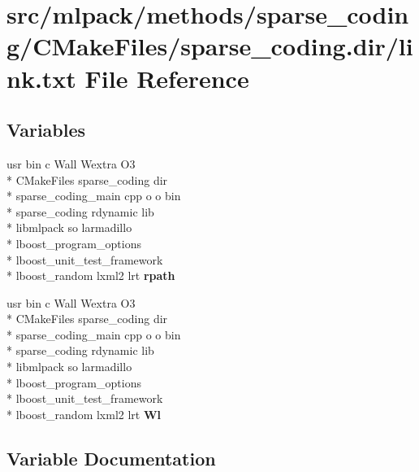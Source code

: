 \section{src/mlpack/methods/sparse\-\_\-coding/\-C\-Make\-Files/sparse\-\_\-coding.dir/link.txt File Reference}
\label{methods_2sparse__coding_2CMakeFiles_2sparse__coding_8dir_2link_8txt}
\subsection*{Variables}
\begin{DoxyCompactItemize}
\item 
usr bin c Wall Wextra O3 \\*
C\-Make\-Files sparse\-\_\-coding dir \\*
sparse\-\_\-coding\-\_\-main cpp o o bin \\*
sparse\-\_\-coding rdynamic lib \\*
libmlpack so larmadillo \\*
lboost\-\_\-program\-\_\-options \\*
lboost\-\_\-unit\-\_\-test\-\_\-framework \\*
lboost\-\_\-random lxml2 lrt {\bf rpath}
\item 
usr bin c Wall Wextra O3 \\*
C\-Make\-Files sparse\-\_\-coding dir \\*
sparse\-\_\-coding\-\_\-main cpp o o bin \\*
sparse\-\_\-coding rdynamic lib \\*
libmlpack so larmadillo \\*
lboost\-\_\-program\-\_\-options \\*
lboost\-\_\-unit\-\_\-test\-\_\-framework \\*
lboost\-\_\-random lxml2 lrt {\bf Wl}
\end{DoxyCompactItemize}


\subsection{Variable Documentation}
